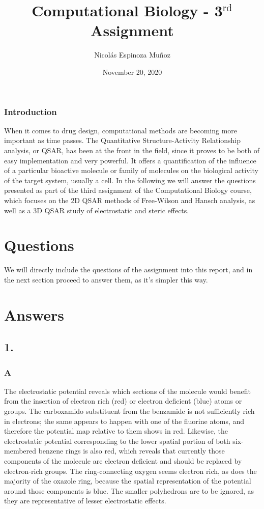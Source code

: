 \documentclass[a4paper, 12pt, notitlepage]{article}
\title{Computational Biology - 3$^\text{rd}$ Assignment}
\author{Nicolás Espinoza Muñoz}
\date{November 20, 2020}
\begin{document}
\maketitle
\subsubsection*{Introduction}
When it comes to drug design, computational methods are becoming more important as time passes. The Quantitative Structure-Activity Relationship analysis, or QSAR, has been at the front in the field, since it proves to be both of easy implementation and very powerful. It offers a quantification of the influence of a particular bioactive molecule or family of molecules on the biological activity of the target system, usually a cell. In the following we will answer the questions presented as part of the third assignment of the Computational Biology course, which focuses on the 2D QSAR methods of Free-Wilson and Hansch analysis, as well as a 3D QSAR study of electrostatic and steric effects.

\section*{Questions}
We will directly include the questions of the assignment into this report, and in the next section proceed to answer them, as it's simpler this way.


\section*{Answers}
\subsection*{1.}
\subsubsection*{A}
The electrostatic potential reveals which sections of the molecule would benefit from the insertion of electron rich (red) or electron deficient (blue) atoms or groups. The carboxamido substituent from the benzamide is not sufficiently rich in electrons; the same appears to happen with one of the fluorine atoms, and therefore the potential map relative to them shows in red. Likewise, the electrostatic potential corresponding to the lower spatial portion of both six-membered benzene rings is also red, which reveals that currently those components of the molecule are electron deficient and should be replaced by electron-rich groups. The ring-connecting oxygen seems electron rich, as does the majority of the oxazole ring, because the spatial representation of the potential around those components is blue. The smaller polyhedrons are to be ignored, as they are representative of lesser electrostatic effects.
\end{document}

